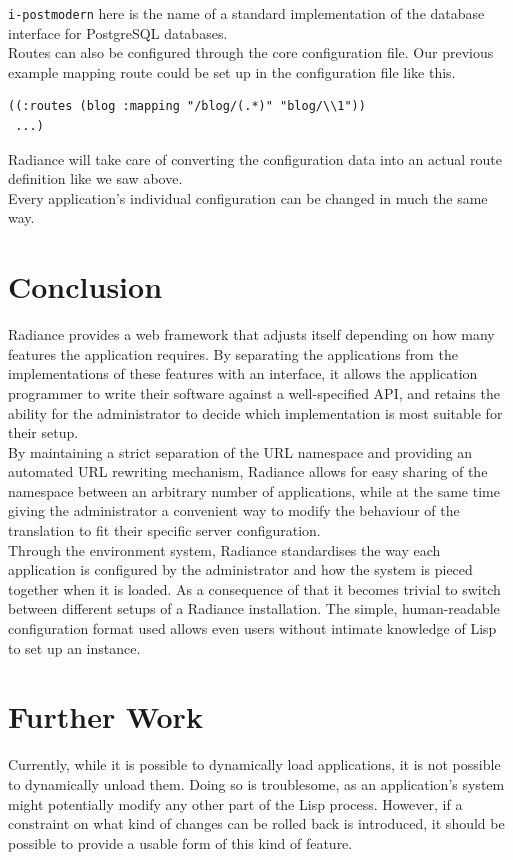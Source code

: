 \documentclass{sig-alternate}
\begin{document}
\texttt{i-postmodern} here is the name of a standard implementation of the database interface for PostgreSQL databases. \\

Routes can also be configured through the core configuration file. Our previous example mapping route could be set up in the configuration file like this.

\begin{verbatim}
((:routes (blog :mapping "/blog/(.*)" "blog/\\1"))
 ...)
\end{verbatim}

Radiance will take care of converting the configuration data into an actual route definition like we saw above. \\

Every application's individual configuration can be changed in much the same way.

\section{Conclusion}
Radiance provides a web framework that adjusts itself depending on how many features the application requires. By separating the applications from the implementations of these features with an interface, it allows the application programmer to write their software against a well-specified API, and retains the ability for the administrator to decide which implementation is most suitable for their setup. \\

By maintaining a strict separation of the URL namespace and providing an automated URL rewriting mechanism, Radiance allows for easy sharing of the namespace between an arbitrary number of applications, while at the same time giving the administrator a convenient way to modify the behaviour of the translation to fit their specific server configuration. \\

Through the environment system, Radiance standardises the way each application is configured by the administrator and how the system is pieced together when it is loaded. As a consequence of that it becomes trivial to switch between different setups of a Radiance installation. The simple, human-readable configuration format used allows even users without intimate knowledge of Lisp to set up an instance.

\section{Further Work}
Currently, while it is possible to dynamically load applications, it is not possible to dynamically unload them. Doing so is troublesome, as an application's system might potentially modify any other part of the Lisp process. However, if a constraint on what kind of changes can be rolled back is introduced, it should be possible to provide a usable form of this kind of feature. \\
\end{document}
